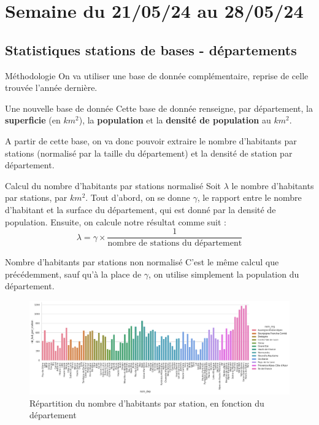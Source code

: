 \smallframetitle

\section{Semaine du 21/05/24 au 28/05/24}
\insertsectionframe

\subsection{Statistiques stations de bases - départements}
\insertsubsectionframe

\begin{frame}{Méthodologie}
    On va utiliser une base de donnée complémentaire, reprise de celle trouvée l'année dernière.

    \begin{block}{Une nouvelle base de donnée\footnotemark}
        Cette base de donnée renseigne, par département, la \textbf{superficie} (en $\unit{km^2}$), la \textbf{population} et la \textbf{densité de population} au $\unit{km^2}$.
    \end{block}
    
    A partir de cette base, on va donc pouvoir extraire le nombre d'habitants par stations (normalisé par la taille du département) et la densité de station par département.

    \begin{block}{Calcul du nombre d'habitants par stations normalisé}
        Soit $\lambda$ le nombre d'habitants par stations, par $\unit{km^2}$. Tout d'abord, on se donne $\gamma$, le rapport entre le nombre d'habitant et la surface du département, qui est donné par la densité de population.
        Ensuite, on calcule notre résultat comme suit :$$\lambda = \gamma\times\frac{1}{\text{nombre de stations du département}}$$
    \end{block}

\end{frame}

\begin{frame}{Nombre d'habitants par stations non normalisé}
    C'est le même calcul que précédemment, sauf qu'à la place de $\gamma$, on utilise simplement la population du département.
    \begin{figure}
        \includegraphics[width=0.9\paperwidth]{images/barplots/nb_hab_par_station_par_dep.png}
        \caption{\label{fig:nb_hap_par_stat_par_dep}Répartition du nombre d'habitants par station, en fonction du département}
    \end{figure}
\end{frame}

